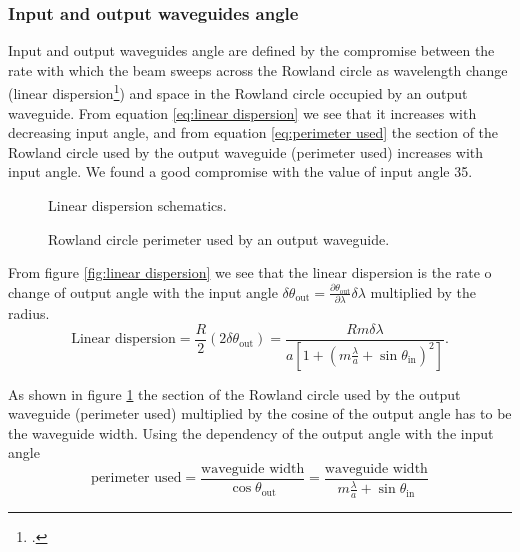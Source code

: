 \documentclass[12pt,twoside,english]{book}
\renewcommand{\~}{\perispomeni}%
\numberwithin{equation}{section}
\numberwithin{figure}{section}
\begin{document}
\subsubsection{Input and output waveguides angle}
Input and output waveguides angle are defined by the compromise between the rate with which the beam sweeps across the Rowland circle as wavelength change (linear dispersion\footcite{Chowdhury:2000p56}) and space in the Rowland circle occupied by an output waveguide. From equation \ref{eq:linear dispersion} we see that it increases with decreasing input angle, and from equation \ref{eq:perimeter used} the section of the Rowland circle used by the output waveguide (perimeter used) increases with input angle. We found a good compromise with the value of input angle 35.
\begin{figure}[h]
	\begin{minipage}[t]{0.49\textwidth}
	
	\caption{Linear dispersion schematics.\label{fig:linear dispersion}}
\end{minipage}
\hfill
\begin{minipage}[t]{0.49\textwidth}
	
	\caption{Rowland circle perimeter used by an output waveguide.\label{fig:perimeter used}}
	\end{minipage}
\end{figure}

From figure \ref{fig:linear dispersion} we see that the linear dispersion is the rate o change of output angle with the input angle $\delta\theta_{\text{out}}=\frac{\partial\theta_{\text{out}}}{\partial\lambda}\delta\lambda$ multiplied by the radius.
\begin{equation}
\text{Linear dispersion}=\frac{R}{2}\left(2\delta\theta_{\text{out}}\right)=\frac{Rm\delta\lambda}{a\left[1+\left(m\frac{\lambda}{a}+\sin\theta_{\text{in}}\right)^{2}\right]}.
\label{eq:linear dispersion}
\end{equation}

As shown in figure \ref{fig:perimeter used} the section of the Rowland circle used by the output waveguide (perimeter used) multiplied by the cosine of the output angle has to be the waveguide width. Using the dependency of the output angle with the input angle
\begin{equation}
\text{perimeter used}
=\frac{\text{waveguide width}}{\cos\theta_{\text{out}}}
=\frac{\text{waveguide width}}{m\frac{\lambda}{a}+\sin\theta_{\text{in}}}
\label{eq:perimeter used}
\end{equation}
\end{document}

